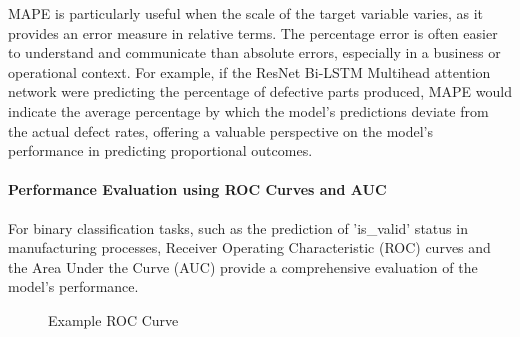 MAPE is particularly useful when the scale of the target variable varies, as it provides an error measure in relative terms. The percentage error is often easier to understand and communicate than absolute errors, especially in a business or operational context. For example, if the ResNet Bi-LSTM Multihead attention network were predicting the percentage of defective parts produced, MAPE would indicate the average percentage by which the model's predictions deviate from the actual defect rates, offering a valuable perspective on the model's performance in predicting proportional outcomes.

\paragraph{\textbf{Performance Evaluation using ROC Curves and AUC}}
For binary classification tasks, such as the prediction of 'is\_valid' status in manufacturing processes, Receiver Operating Characteristic (ROC) curves and the Area Under the Curve (AUC) provide a comprehensive evaluation of the model's performance.

\begin{figure}[h]
  \centering
  \caption{Example ROC Curve}
  \label{fig:roc}
\end{figure}

